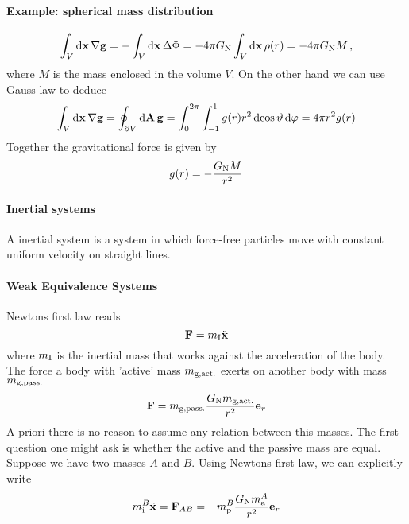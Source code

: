 \paragraph{Example: spherical mass distribution}
\begin{equation}
    \int_V\dif{\vec{x}}\, \nabla\vec{g}=-\int_V\dif{\vec{x}}\, \Delta\Phi = -4\pi G\textsubscript{N}\int_V\dif{\vec{x}}\,\rho(r)= -4\pi G\textsubscript{N} M\, ,
\end{equation}
where $M$ is the mass enclosed in the volume $V$. On the other hand we can use Gauss law to deduce
\begin{equation}
    \int_V\dif{\vec{x}}\, \nabla\vec{g}=\oint_{\partial V}\dif{\vec{A}}\, \vec{g} =\int_{0}^{2\pi}\int_{-1}^{1} g(r)r^2\dif{\cos\vartheta}\dif{\varphi}=4\pi r^2g(r)
\end{equation}
Together the gravitational force is given by
\begin{equation}
    g(r)=-\frac{G\textsubscript{N}M}{r^2}
\end{equation}
\paragraph{Inertial systems}
A inertial system is a system in which force-free particles move with constant uniform velocity on straight lines.
\paragraph{Weak Equivalence Systems}
Newtons first law reads
\begin{equation}
    \vec{F}=m\textsubscript{I}\ddot{\vec{x}}
\end{equation}
where $m\textsubscript{I}$ is the inertial mass that works against the acceleration of the body.
The force a body with 'active' mass $m\textsubscript{g,act.}$ exerts on another
body with mass $m\textsubscript{g,pass.}$
\begin{equation}
    \vec{F}=m\textsubscript{g,pass.}\frac{G\textsubscript{N}m\textsubscript{g,act.}}{r^2}\vec{e}_r
\end{equation}
A priori there is no reason to assume any relation between this masses. The first question one might ask is whether the active and the passive mass are equal. Suppose we have two masses $A$ and $B$. Using Newtons first law, we can explicitly write
\begin{equation}
    m^{B}_{\text{i}}\ddot{\vec{x}}=\vec{F}_{AB}=-	m^{B}_{\text{p}}\frac{G\textsubscript{N}m^{A}_{\text{a}}}{r^2}\vec{e}_r
\end{equation}
